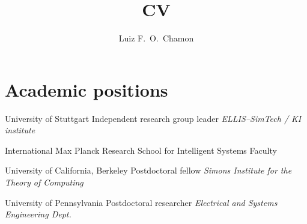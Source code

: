 \documentclass{cvlfoc}
\author[Luiz F.\ O.\ Chamon]{Luiz F.\ O.\ Chamon}
\title{CV}
\begin{document}
\maketitle



%
%
%
%



\section*{Academic positions}

\begin{entrydate}
		{University of Stuttgart}
		{Independent research group leader}
		{\emph{ELLIS--SimTech / KI institute}}

		{International Max Planck Research School for Intelligent Systems}
		{Faculty}
		{}

		{University of California, Berkeley}
		{Postdoctoral fellow}
		{\emph{Simons Institute for the Theory of Computing}}

		{University of Pennsylvania}
		{Postdoctoral researcher}
		{\emph{Electrical and Systems Engineering Dept.}}
\end{entrydate}
\end{document}
